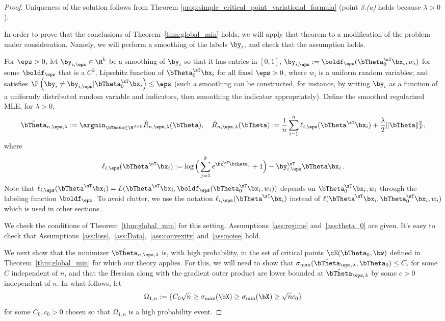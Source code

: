 \begin{proof}
Uniqueness of the solution follows from Theorem \ref{prop:simple_critical_point_variational_formula}
(point \textit{3.(a)} holds because $\lambda>0$).

In order to prove that the conclusions of Theorem~\ref{thm:global_min} holds, we
will apply that theorem to a modification of the problem under consideration.
Namely, we will perform a smoothing of the labels $\by_i$, and check that the assumption holds.

For $\eps>0$, let $\by_{i,\eps}\in\R^k$ be a smoothing of $\by_i$ so that it has entries in $[0,1]$, 
$\by_{i,\eps} := \boldf_{\eps}(\bTheta_0^{\sT}\bx_i, w_i)$ for some $\boldf_\eps$ that 
is a $C^2$, Lipschitz function of $\bTheta_0^{\sT}\bx_i$ for all fixed $\eps>0$, where $w_i$ is a uniform random variables; and satisfies 
$\P\left(\by_i \neq \by_{i,\eps}| \bTheta_0^\sT\bx_i\right) \le \eps$ (such a smoothing can be constructed, for instance, by writing $\by_i$ as a function of a uniformly distributed random variable and indicators, then smoothing the indicator appropriately).
Define the smoothed regularized MLE, for $\lambda>0$,
\begin{equation}
     \hat\bTheta_{n,\eps,\lambda} := 
     \argmin_{\bTheta\in\R^{d\times k}}  \hat R_{n,\eps,\lambda}(\bTheta),
    \quad
\hat R_{n,\eps,\lambda}(\bTheta) :=
     \frac1n \sum_{i=1}^n
    \ell_{i,\eps}(\bTheta^\sT\bx_i) + \frac{\lambda}{2} \|\bTheta\|_F^2,
\end{equation}
where
\begin{equation}
    \ell_{i,\eps}(\bTheta^\sT\bx_i):=
   \log\Big( \sum_{j=1}^k e^{\bx_i^\sT\btheta_j} + 1\Big)  
   -  \by_{i,\eps}^\sT \bTheta \bx_i
  \, .
\end{equation}
%
Note that $\ell_{i,\eps}(\bTheta^\sT\bx_i) = 
L(\bTheta^\sT\bx_i,\boldf_{\eps}(\bTheta_0^\sT\bx_i,w_i))$  depends on $\bTheta_0^\sT\bx_i,w_i$ through the labeling function $\boldf_{\eps}$. 
To avoid clutter, we use the notation $\ell_{i,\eps}(\bTheta^\sT\bx_i)$ instead of $\ell(\bTheta^\sT\bx_i,\bTheta_0^\sT\bx_i,w_i)$ which is used in other sections.


We check the conditions of Theorem~\ref{thm:global_min} for this setting.
Assumptions~\ref{ass:regime} and~\ref{ass:theta_0} are given.
It's easy to check that Assumptions~\ref{ass:loss},~\ref{ass:Data},~\ref{ass:convexity} and~\ref{ass:noise} hold.

We next show that the minimizer $\hat\bTheta_{n,\eps,\lambda}$ is, with high probability, in the set of critical points $\cE(\bTheta_0,\bw)$ defined in Theorem~\ref{thm:global_min} 
for which our theory applies.
For this, we will need to show that $\sigma_{\max}(\hat\bTheta_{\eps,\lambda}, \bTheta_0) \le C,$  for some $C$ independent of $n$,
and that the Hessian  along with the gradient outer product are 
lower bounded
at $\hat\bTheta_{\eps,\lambda}$ by some $c>0$ independent of $n$.
In what follows, let 
\begin{equation}
    \Omega_{1,n} := \{   C_0\sqrt{n} \ge \sigma_{\max}(\bX) \ge \sigma_{\min}(\bX)\ge \sqrt{n} c_0 \}
\end{equation}
for some $C_0,c_0 >0$ chosen so that $\Omega_{1,n}$ is a high probability event.


\end{proof}
